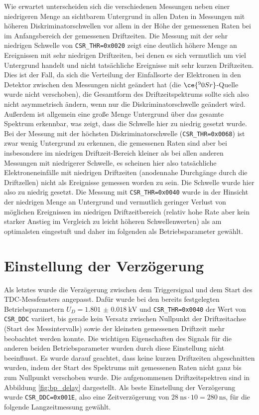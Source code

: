 Wie erwartet unterscheiden sich die verschiedenen Messungen neben einer niedrigeren Menge an sichtbarem Untergrund in allen Daten in Messungen mit höheren Diskriminatorschwellen vor allem in der Höhe der gemessenen Raten bei im Anfangsbereich der gemessenen Driftzeiten. Die Messung mit der sehr niedrigen Schwelle von \texttt{CSR\_THR=0x0020} zeigt eine deutlich höhere Menge an Ereignissen mit sehr niedrigen Driftzeiten, bei denen es sich vermutlich um viel Untergrund handelt und nicht tatsächliche Ereignisse mit sehr kurzen Driftzeiten. Dies ist der Fall, da sich die Verteilung der Einfallsorte der Elektronen in den Detektor zwischen den Messungen nicht geändert hat (die $\ce{^90Sr}$-Quelle wurde nicht verschoben), die Gesamtform des Driftzeitspektrums sollte sich also nicht asymmetrisch ändern, wenn nur die Diskriminatorschwelle geändert wird. Außerdem ist allgemein eine große Menge Untergrund über das gesamte Spektrum erkennbar, was zeigt, dass die Schwelle hier zu niedrig gesetzt wurde. Bei der Messung mit der höchsten Diskriminatorschwelle (\texttt{CSR\_THR=0x0068}) ist zwar wenig Untergrund zu erkennen, die gemessenen Raten sind aber bei insbesondere im niedrigen Driftzeit-Bereich  kleiner als bei allen anderen Messungen mit niedrigerer Schwelle, es scheinen hier also tatsächliche Elektroneneinfälle mit niedrigen Driftzeiten (anodennahe Durchgänge durch die Driftzellen) nicht als Ereignisse gemessen worden zu sein. Die Schwelle wurde hier also zu niedrig gesetzt. Die Messung mit \texttt{CSR\_THR=0x0040} wurde in der Hinsicht der niedrigen Menge an Untergrund und vermutlich geringer Verlust von möglichen Ereignissen im niedrigen Driftzeitbereich (relativ hohe Rate aber kein starker Anstieg im Vergleich zu leicht höheren Schwellenwerten) als am optimalsten eingestuft und daher im folgenden als Betriebsparameter gewählt.

\section{Einstellung der Verzögerung}\label{sec:delay_bp}

Als letztes wurde die Verzögerung zwischen dem Triggersignal und dem Start des TDC-Messfensters angepasst. Dafür wurde bei den bereits festgelegten Betriebsparametern $U_D=\SI{1.801(18)}{\kilo\V}$ und \texttt{CSR\_THR=0x0040} der Wert von \texttt{CSR\_DDC} variiert, bis gerade kein Versatz zwischen Nullpunkt der Driftzeitachse (Start des Messintervalls) sowie der kleinsten gemessenen Driftzeit mehr beobachtet werden konnte. Die wichtigen Eigenschaften des Signals für die anderen beiden Betriebsparameter wurden durch diese Einstellung nicht beeinflusst. Es wurde darauf geachtet, dass keine kurzen Driftzeiten abgeschnitten wurden, indem der Start des Spektrums mit gemessenen Raten nicht ganz bis zum Nullpunkt verschoben wurde. Die aufgenommenen Driftzeitspektren sind in Abbildung \ref{fig:bp_delay} dargestellt. Als beste Einstellung der Verzögerung wurde \texttt{CSR\_DDC=0x001E}, also eine Zeitverzögerung von $\SI{28}{\nano\s}\cdot 10=\SI{280}{\nano\s}$, für die folgende Langzeitmessung gewählt.

